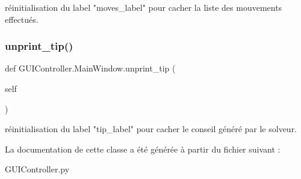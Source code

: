 \begin{DoxyVerb}réinitialisation du label "moves_label" pour cacher la liste des mouvements effectués. \end{DoxyVerb}
 \mbox{\label{classGUIController_1_1MainWindow_a60df967a8de9a0897e327d65518d8fc6}} 
\subsubsection{\texorpdfstring{unprint\+\_\+tip()}{unprint\_tip()}}
{\footnotesize\ttfamily def G\+U\+I\+Controller.\+Main\+Window.\+unprint\+\_\+tip (\begin{DoxyParamCaption}\item[{}]{self }\end{DoxyParamCaption})}

\begin{DoxyVerb}réinitialisation du label "tip_label" pour cacher le conseil généré par le solveur. \end{DoxyVerb}
 

La documentation de cette classe a été générée à partir du fichier suivant \+:\begin{DoxyCompactItemize}
\item 
G\+U\+I\+Controller.\+py\end{DoxyCompactItemize}
